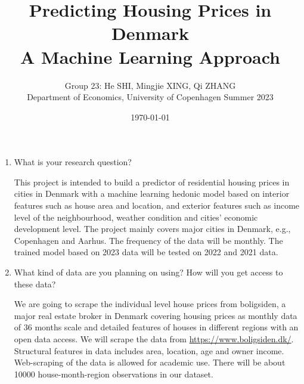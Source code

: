\documentclass[12pt]{article} %
\title{Predicting Housing Prices in Denmark\\ A Machine Learning Approach}
\author{Group 23: He SHI, Mingjie XING, Qi ZHANG\\Department of Economics, University of Copenhagen Summer 2023}
\date{\today} %
\begin{document}
\maketitle


\begin{enumerate}

  \item What is your research question?\par
  		This project is intended to build a predictor of residential housing prices in cities in Denmark with a machine learning hedonic model based on interior features such as house area and location, and exterior features such as income level of the neighbourhood, weather condition and cities' economic development level. The project mainly covers major cities in Denmark, e.g., Copenhagen and Aarhus. The frequency of the data will be monthly. The trained model based on 2023 data will be tested on 2022 and 2021 data. 

  \item What kind of data are you planning on using? How will you get access to these data?\par
			We are going to scrape the individual level house prices from boligsiden, a major real estate broker in Denmark covering housing prices as monthly data of 36 months scale and detailed features of houses in different regions with an open data access. We will scrape the data from \url{https://www.boligsiden.dk/}. Structural features in data includes area, location, age and owner income. Web-scraping of the data is allowed for academic use. There will be about 10000 house-month-region observations in our dataset. 


\end{enumerate}
\end{document}
